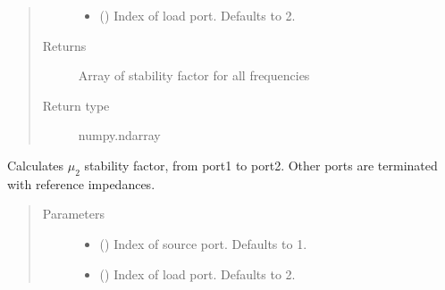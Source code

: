 \documentclass[letterpaper,10pt,english]{sphinxmanual}
\begin{document}
\begin{fulllineitems}
\begin{fulllineitems}
\begin{quote}
\begin{description}
\begin{itemize}
\item {} 
 (\sphinxstyleliteralemphasis{\sphinxupquote{, }}) \textendash{} Index of load port. Defaults to 2.

\end{itemize}

\item[{Returns}] \leavevmode
Array of stability factor for all frequencies

\item[{Return type}] \leavevmode
numpy.ndarray

\end{description}\end{quote}

\end{fulllineitems}


\begin{fulllineitems}
\label{\detokenize{touchstone:touchstone.spfile.stability_factor_mu2}}
Calculates \(\mu_2\) stability factor, from port1 to port2. Other ports are terminated with reference impedances.
\begin{quote}\begin{description}
\item[{Parameters}] \leavevmode\begin{itemize}
\item {} 
 (\sphinxstyleliteralemphasis{\sphinxupquote{, }}) \textendash{} Index of source port. Defaults to 1.

\item {} 
 (\sphinxstyleliteralemphasis{\sphinxupquote{, }}) \textendash{} Index of load port. Defaults to 2.

\end{itemize}


\end{description}
\end{quote}
\end{fulllineitems}
\end{fulllineitems}
\end{document}
